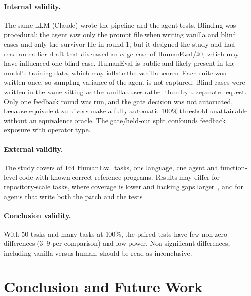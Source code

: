 \documentclass[runningheads]{llncs}
\begin{document}
\paragraph{Internal validity.} The same LLM (Claude) wrote the pipeline and the agent tests. Blinding was procedural: the agent saw only the prompt file when writing vanilla and blind cases and only the survivor file in round 1, but it designed the study and had read an earlier draft that discussed an edge case of HumanEval/40, which may have influenced one blind case. HumanEval is public and likely present in the model's training data, which may inflate the vanilla scores. Each suite was written once, so sampling variance of the agent is not captured. Blind cases were written in the same sitting as the vanilla cases rather than by a separate request. Only one feedback round was run, and the gate decision was not automated, because equivalent survivors make a fully automatic 100\% threshold unattainable without an equivalence oracle. The gate/held-out split confounds feedback exposure with operator type.

\paragraph{External validity.} The study covers \nTasks{} of 164 HumanEval tasks, one language, one agent and function-level code with known-correct reference programs. Results may differ for repository-scale tasks, where coverage is lower and hacking gaps larger~\cite{zhao2026specbench}, and for agents that write both the patch and the tests.

\paragraph{Conclusion validity.} With 50 tasks and many tasks at 100\%, the paired tests have few non-zero differences (3--9 per comparison) and low power. Non-significant differences, including vanilla versus human, should be read as inconclusive.

\section{Conclusion and Future Work}\label{sec:conclusion}
\end{document}
